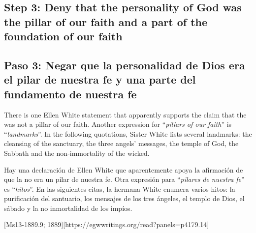 \subsection*{Step 3: Deny that the personality of God was the pillar of our faith and a part of the foundation of our faith}


\subsection*{Paso 3: Negar que la personalidad de Dios era el pilar de nuestra fe y una parte del fundamento de nuestra fe}


There is one Ellen White statement that apparently supports the claim that the  was not a pillar of our faith. Another expression for “\textit{pillars of our faith}” is “\textit{landmarks}”. In the following quotations, Sister White lists several landmarks: the cleansing of the sanctuary, the three angels’ messages, the temple of God, the Sabbath and the non-immortality of the wicked.


Hay una declaración de Ellen White que aparentemente apoya la afirmación de que la  no era un pilar de nuestra fe. Otra expresión para “\textit{pilares de nuestra fe}” es “\textit{hitos}”. En las siguientes citas, la hermana White enumera varios hitos: la purificación del santuario, los mensajes de los tres ángeles, el templo de Dios, el sábado y la no inmortalidad de los impíos.


[Ms13-1889.9; 1889][https://egwwritings.org/read?panels=p4179.14]



